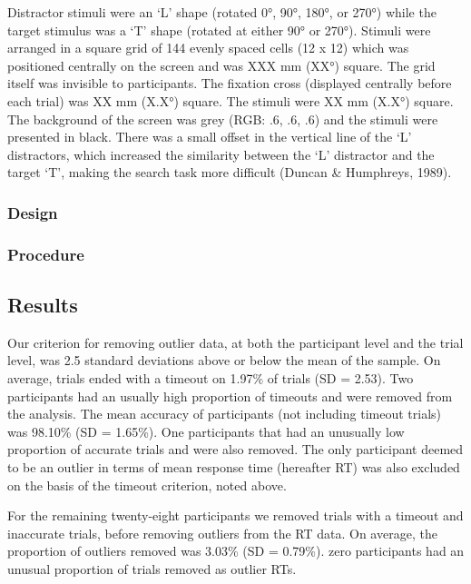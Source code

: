 \documentclass[
  man]{apa7}
\begin{document}
Distractor stimuli were an `L' shape (rotated 0°, 90°, 180°, or 270°) while the target stimulus was a `T' shape (rotated at either 90° or 270°). Stimuli were arranged in a square grid of 144 evenly spaced cells (12 x 12) which was positioned centrally on the screen and was XXX mm (XX°) square. The grid itself was invisible to participants. The fixation cross (displayed centrally before each trial) was XX mm (X.X°) square. The stimuli were XX mm (X.X°) square. The background of the screen was grey (RGB: .6, .6, .6) and the stimuli were presented in black. There was a small offset in the vertical line of the `L' distractors, which increased the similarity between the `L' distractor and the target `T', making the search task more difficult (Duncan \& Humphreys, 1989).

\hypertarget{design}{%
\subsubsection{Design}\label{design}}

\hypertarget{procedure}{%
\subsubsection{Procedure}\label{procedure}}

\hypertarget{results}{%
\subsection{Results}\label{results}}

Our criterion for removing outlier data, at both the participant level and the trial level, was 2.5 standard deviations above or below the mean of the sample. On average, trials ended with a timeout on 1.97\% of trials (SD = 2.53). Two participants had an usually high proportion of timeouts and were removed from the analysis. The mean accuracy of participants (not including timeout trials) was 98.10\% (SD = 1.65\%). One participants that had an unusually low proportion of accurate trials and were also removed. The only participant deemed to be an outlier in terms of mean response time (hereafter RT) was also excluded on the basis of the timeout criterion, noted above.

For the remaining twenty-eight participants we removed trials with a timeout and inaccurate trials, before removing outliers from the RT data. On average, the proportion of outliers removed was 3.03\% (SD = 0.79\%). zero participants had an unusual proportion of trials removed as outlier RTs.
\end{document}
